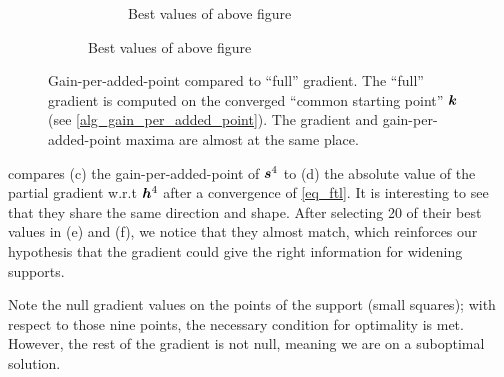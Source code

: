\begin{figure}[!h]
\begin{subfigure}[b]{0.8\textwidth}
\begin{subfigure}[b]{0.49\linewidth}
\caption{Best values of above figure}
\end{subfigure}
\end{subfigure}
\caption{Gain-per-added-point compared to “full” gradient. The “full” gradient is computed on the converged “common starting point” $\bm{k}$ (see \cref{alg_gain_per_added_point}). The gradient and gain-per-added-point maxima are almost at the same place. }\label{fig_gain_n4}
\end{figure}

 compares (c) the gain-per-added-point of $\bm{s}^4$ to (d) the absolute value of the partial gradient w.r.t $\bm{h}^4$ after a convergence of \eqref{eq_ftl}. It is interesting to see that they share the same direction and shape. After selecting 20 of their best values in (e) and (f), we notice that they almost match, which reinforces our hypothesis that the gradient could give the right information for widening supports.

Note the null gradient values on the points of the support (small squares); with respect to those nine points, the necessary condition for optimality is met. However, the rest of the gradient is not null, meaning we are on a suboptimal solution.

